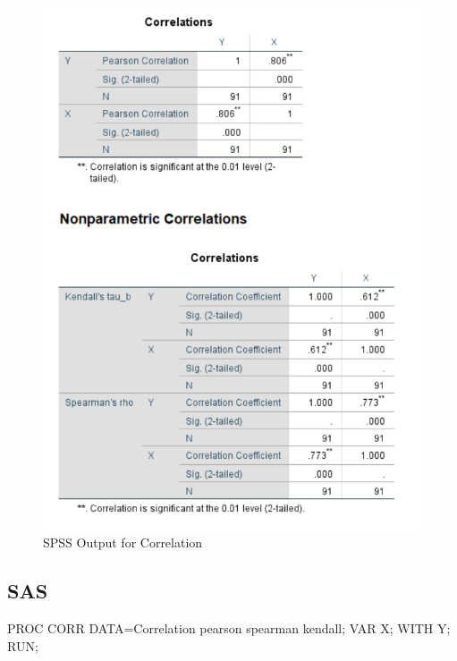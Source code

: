 \documentclass[
]{book}
\newenvironment{Shaded}{\begin{snugshade}}{\end{snugshade}}
\newcommand{\NormalTok}[1]{#1}
\begin{document}
\begin{figure}[!h]
\includegraphics{Screenshots/Correlation/corrSPSS} \caption{\label{fig:corrSPSS}SPSS Output for Correlation}\label{fig:corrSPSS}
\end{figure}

\hypertarget{sas}{%
\subsection{SAS}\label{sas}}

\begin{Shaded}
\begin{Highlighting}[]
\NormalTok{PROC CORR DATA=Correlation pearson spearman kendall;}
\NormalTok{    VAR X;}
\NormalTok{    WITH Y;}
\NormalTok{RUN;}
\end{Highlighting}
\end{Shaded}
\end{document}

